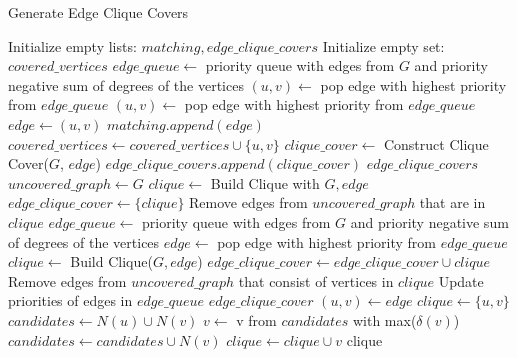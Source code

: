 \begin{algorithm}
\caption{Generate Edge Clique Covers}
\begin{algorithmic}[1]
\State Initialize empty lists: $matching, edge\_clique\_covers$
\State Initialize empty set: $covered\_vertices$
\State $edge\_queue\gets$ priority queue with edges from $G$ and priority negative sum of degrees of the vertices
    \State $(u, v)\gets$ pop edge with highest priority from $edge\_queue$
        \State $(u, v)\gets$ pop edge with highest priority from $edge\_queue$
    \EndWhile
    \State $edge\gets (u, v)$
    \State $matching.append(edge)$
    \State $covered\_vertices\gets covered\_vertices\cup \{u, v\}$
\EndFor
{}
    \State $clique\_cover\gets$ Construct Clique Cover($G$, $edge$)
    \State $edge\_clique\_covers.append(clique\_cover)$
\EndFor
\Return $edge\_clique\_covers$
\EndProcedure
{}
\State $uncovered\_graph\gets G$
\State $clique\gets$ Build Clique with $G, edge$
\State $edge\_clique\_cover\gets \{clique\}$
\State Remove edges from $uncovered\_graph$ that are in $clique$
\State $edge\_queue\gets$ priority queue with edges from $G$ and priority negative sum of degrees of the vertices
    \State $edge\gets$ pop edge with highest priority from $edge\_queue$
    \State $clique\gets$ Build Clique($G, edge$)
    \State $edge\_clique\_cover\gets edge\_clique\_cover\cup {clique}$
    \State Remove edges from $uncovered\_graph$ that consist of vertices in $clique$
    \State Update priorities of edges in $edge\_queue$
\EndWhile
\Return $edge\_clique\_cover$
\EndProcedure
{}
\State $(u, v)\gets edge$
\State $clique\gets \{u, v\}$
\State $candidates\gets N(u)\cup N(v)$
    \State $v\gets$ v from $candidates$ with max($\delta(v)$)
    \State $candidates\gets candidates\cup N(v)$
    \State $clique\gets clique\cup {v}$
\EndWhile
\Return clique
\EndProcedure
\end{algorithmic}
\end{algorithm}

